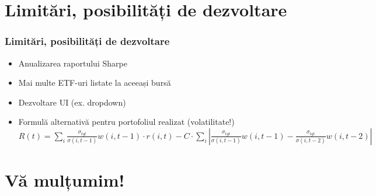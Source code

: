 \documentclass[notheorems]{beamer}
\theoremstyle{definition}
\begin{document}
\section{Limitări, posibilități de dezvoltare}
\begin{frame}
\frametitle{Limitări, posibilități de dezvoltare}
\begin{itemize}
    \item<1-> Anualizarea raportului Sharpe
    \item<2-> Mai multe ETF-uri listate la aceeași bursă
    \item<3-> Dezvoltare UI (ex. dropdown)
    \item<4-> Formulă alternativă pentru portofoliul realizat (volatilitate!) \\
    $\displaystyle R(t) = \sum_i \frac{\sigma_{tgt}}{\sigma(i,t-1)}w(i,t-1)\cdot r(i,t) 
    - C \cdot\sum_i\left|\frac{\sigma_{tgt}}{\sigma(i,t-1)}w(i,t-1) - \frac{\sigma_{tgt}}{\sigma(i,t-2)}w(i,t-2)\right|$
\end{itemize}
\end{frame}

\section{Vă mulțumim!}
\end{document}

